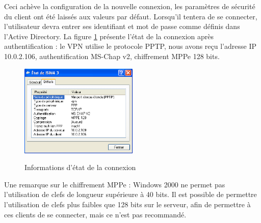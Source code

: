 Ceci achève la configuration de la nouvelle connexion, les paramètres de sécurité du client ont été laissés aux valeurs par défaut. Lorsqu'il tentera de se connecter, l'utilisateur devra entrer ses identifiant et mot de passe comme définis dans l'Active Directory. La figure \ref{VPN_ETAPE7} présente l'état de la connexion après authentification : le VPN utilise le protocole PPTP, nous avons reçu l'adresse IP 10.0.2.106, authentification MS-Chap v2, chiffrement MPPe 128 bits.

\begin{figure}[H]
	\begin{center}
		\includegraphics[width=0.50\textwidth]{partie_2/screen_windows/etape7.PNG}\\
	\end{center}
	\caption{Informations d'état de la connexion}
	\label{VPN_ETAPE7}
\end{figure}



Une remarque sur le chiffrement MPPe : Windows 2000 ne permet pas l'utilisation de clefs de longueur supérieure à 40 bits. Il est possible de permettre l'utilisation de clefs plus faibles que 128 bits sur le serveur, afin de permettre à ces clients de se connecter, mais ce n'est pas recommandé.

